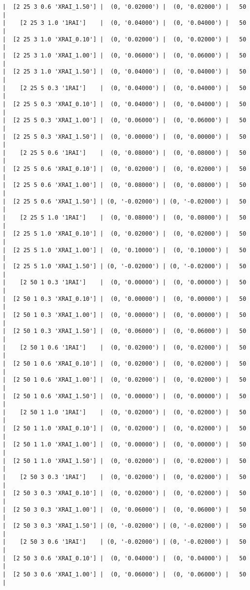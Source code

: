 \documentclass{article}
\begin{document}
\begin{verbatim}
|  [2 25 3 0.6 'XRAI_1.50'] |  (0, '0.02000') |  (0, '0.02000') |   50  |
|    [2 25 3 1.0 '1RAI']    |  (0, '0.04000') |  (0, '0.04000') |   50  |
|  [2 25 3 1.0 'XRAI_0.10'] |  (0, '0.02000') |  (0, '0.02000') |   50  |
|  [2 25 3 1.0 'XRAI_1.00'] |  (0, '0.06000') |  (0, '0.06000') |   50  |
|  [2 25 3 1.0 'XRAI_1.50'] |  (0, '0.04000') |  (0, '0.04000') |   50  |
|    [2 25 5 0.3 '1RAI']    |  (0, '0.04000') |  (0, '0.04000') |   50  |
|  [2 25 5 0.3 'XRAI_0.10'] |  (0, '0.04000') |  (0, '0.04000') |   50  |
|  [2 25 5 0.3 'XRAI_1.00'] |  (0, '0.06000') |  (0, '0.06000') |   50  |
|  [2 25 5 0.3 'XRAI_1.50'] |  (0, '0.00000') |  (0, '0.00000') |   50  |
|    [2 25 5 0.6 '1RAI']    |  (0, '0.08000') |  (0, '0.08000') |   50  |
|  [2 25 5 0.6 'XRAI_0.10'] |  (0, '0.02000') |  (0, '0.02000') |   50  |
|  [2 25 5 0.6 'XRAI_1.00'] |  (0, '0.08000') |  (0, '0.08000') |   50  |
|  [2 25 5 0.6 'XRAI_1.50'] | (0, '-0.02000') | (0, '-0.02000') |   50  |
|    [2 25 5 1.0 '1RAI']    |  (0, '0.08000') |  (0, '0.08000') |   50  |
|  [2 25 5 1.0 'XRAI_0.10'] |  (0, '0.02000') |  (0, '0.02000') |   50  |
|  [2 25 5 1.0 'XRAI_1.00'] |  (0, '0.10000') |  (0, '0.10000') |   50  |
|  [2 25 5 1.0 'XRAI_1.50'] | (0, '-0.02000') | (0, '-0.02000') |   50  |
|    [2 50 1 0.3 '1RAI']    |  (0, '0.00000') |  (0, '0.00000') |   50  |
|  [2 50 1 0.3 'XRAI_0.10'] |  (0, '0.00000') |  (0, '0.00000') |   50  |
|  [2 50 1 0.3 'XRAI_1.00'] |  (0, '0.00000') |  (0, '0.00000') |   50  |
|  [2 50 1 0.3 'XRAI_1.50'] |  (0, '0.06000') |  (0, '0.06000') |   50  |
|    [2 50 1 0.6 '1RAI']    |  (0, '0.02000') |  (0, '0.02000') |   50  |
|  [2 50 1 0.6 'XRAI_0.10'] |  (0, '0.02000') |  (0, '0.02000') |   50  |
|  [2 50 1 0.6 'XRAI_1.00'] |  (0, '0.02000') |  (0, '0.02000') |   50  |
|  [2 50 1 0.6 'XRAI_1.50'] |  (0, '0.00000') |  (0, '0.00000') |   50  |
|    [2 50 1 1.0 '1RAI']    |  (0, '0.02000') |  (0, '0.02000') |   50  |
|  [2 50 1 1.0 'XRAI_0.10'] |  (0, '0.02000') |  (0, '0.02000') |   50  |
|  [2 50 1 1.0 'XRAI_1.00'] |  (0, '0.00000') |  (0, '0.00000') |   50  |
|  [2 50 1 1.0 'XRAI_1.50'] |  (0, '0.02000') |  (0, '0.02000') |   50  |
|    [2 50 3 0.3 '1RAI']    |  (0, '0.02000') |  (0, '0.02000') |   50  |
|  [2 50 3 0.3 'XRAI_0.10'] |  (0, '0.02000') |  (0, '0.02000') |   50  |
|  [2 50 3 0.3 'XRAI_1.00'] |  (0, '0.06000') |  (0, '0.06000') |   50  |
|  [2 50 3 0.3 'XRAI_1.50'] | (0, '-0.02000') | (0, '-0.02000') |   50  |
|    [2 50 3 0.6 '1RAI']    | (0, '-0.02000') | (0, '-0.02000') |   50  |
|  [2 50 3 0.6 'XRAI_0.10'] |  (0, '0.04000') |  (0, '0.04000') |   50  |
|  [2 50 3 0.6 'XRAI_1.00'] |  (0, '0.06000') |  (0, '0.06000') |   50  |

\end{verbatim}
\end{document}
